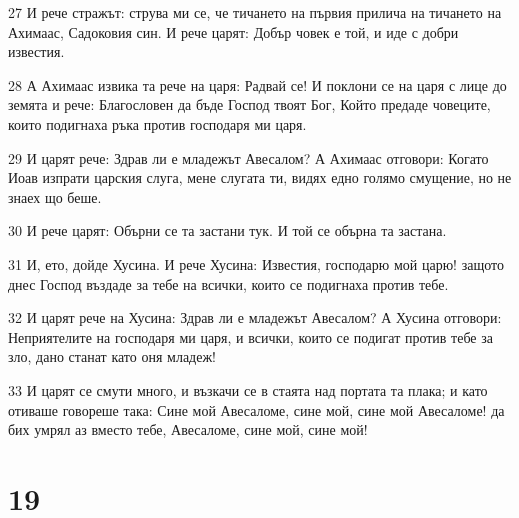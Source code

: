 \par 27 И рече стражът: струва ми се, че тичането на първия прилича на тичането на Ахимаас, Садоковия син. И рече царят: Добър човек е той, и иде с добри известия.
\par 28 А Ахимаас извика та рече на царя: Радвай се! И поклони се на царя с лице до земята и рече: Благословен да бъде Господ твоят Бог, Който предаде човеците, които подигнаха ръка против господаря ми царя.
\par 29 И царят рече: Здрав ли е младежът Авесалом? А Ахимаас отговори: Когато Иоав изпрати царския слуга, мене слугата ти, видях едно голямо смущение, но не знаех що беше.
\par 30 И рече царят: Обърни се та застани тук. И той се обърна та застана.
\par 31 И, ето, дойде Хусина. И рече Хусина: Известия, господарю мой царю! защото днес Господ въздаде за тебе на всички, които се подигнаха против тебе.
\par 32 И царят рече на Хусина: Здрав ли е младежът Авесалом? А Хусина отговори: Неприятелите на господаря ми царя, и всички, които се подигат против тебе за зло, дано станат като оня младеж!
\par 33 И царят се смути много, и възкачи се в стаята над портата та плака; и като отиваше говореше така: Сине мой Авесаломе, сине мой, сине мой Авесаломе! да бих умрял аз вместо тебе, Авесаломе, сине мой, сине мой!

\chapter{19}

